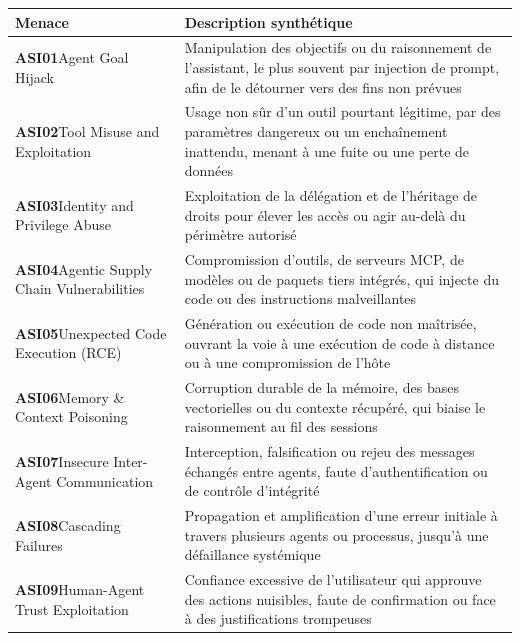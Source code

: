 \documentclass[12pt]{article}
\begin{document}
\begin{table}[H]
    \centering
    \small
    \begin{tabularx}{\textwidth}{|p{4.1cm}|X|}
    \hline
    \rowcolor[gray]{0.9}
    \textbf{Menace} & \textbf{Description synthétique} \\ \hline
    \textbf{ASI01}\newline Agent Goal Hijack & Manipulation des objectifs ou du raisonnement de l'assistant, le plus souvent par injection de prompt, afin de le détourner vers des fins non prévues \\ \hline
    \textbf{ASI02}\newline Tool Misuse and Exploitation & Usage non sûr d'un outil pourtant légitime, par des paramètres dangereux ou un enchaînement inattendu, menant à une fuite ou une perte de données \\ \hline
    \textbf{ASI03}\newline Identity and Privilege Abuse & Exploitation de la délégation et de l'héritage de droits pour élever les accès ou agir au-delà du périmètre autorisé \\ \hline
    \textbf{ASI04}\newline Agentic Supply Chain Vulnerabilities & Compromission d'outils, de serveurs MCP, de modèles ou de paquets tiers intégrés, qui injecte du code ou des instructions malveillantes \\ \hline
    \textbf{ASI05}\newline Unexpected Code Execution (RCE) & Génération ou exécution de code non maîtrisée, ouvrant la voie à une exécution de code à distance ou à une compromission de l'hôte \\ \hline
    \textbf{ASI06}\newline Memory \& Context Poisoning & Corruption durable de la mémoire, des bases vectorielles ou du contexte récupéré, qui biaise le raisonnement au fil des sessions \\ \hline
    \textbf{ASI07}\newline Insecure Inter-Agent Communication & Interception, falsification ou rejeu des messages échangés entre agents, faute d'authentification ou de contrôle d'intégrité \\ \hline
    \textbf{ASI08}\newline Cascading Failures & Propagation et amplification d'une erreur initiale à travers plusieurs agents ou processus, jusqu'à une défaillance systémique \\ \hline
    \textbf{ASI09}\newline Human-Agent Trust Exploitation & Confiance excessive de l'utilisateur qui approuve des actions nuisibles, faute de confirmation ou face à des justifications trompeuses \\ \hline

\end{tabularx}
\end{table}
\end{document}
